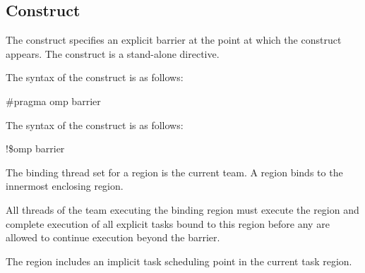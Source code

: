 \subsection{ Construct}
\label{subsec:barrier Construct}
\summary
The  construct specifies an explicit barrier at the point at which the construct 
appears. The  construct is a stand-alone directive.

\syntax
\begin{ccppspecific}
The syntax of the  construct is as follows:

\begin{boxedcode}
\#pragma omp barrier 
\end{boxedcode}
\end{ccppspecific}

\begin{fortranspecific}
The syntax of the  construct is as follows:

\begin{boxedcode}
!\$omp barrier
\end{boxedcode}
\end{fortranspecific}

\binding
The binding thread set for a  region is the current team. A  region 
binds to the innermost enclosing  region. 

\descr
All threads of the team executing the binding  region must execute the 
 region and complete execution of all explicit tasks bound to this  
region before any are allowed to continue execution beyond the barrier.

The  region includes an implicit task scheduling point in the current task 
region.

\def\omptSyncRegionEvents#1{
The \plc{#1-begin} event occurs in each thread encountering the
\code{#1} construct on entry to the \code{#1} region.

The \plc{#1-wait-begin} event occurs when a task begins an interval of active or passive waiting
in a \code{#1} region. 

The \plc{#1-wait-end} event occurs when a task ends an interval of active or passive waiting
and resumes execution in a \code{#1} region. 

The \plc{#1-end} event occurs in each thread encountering the
\code{#1} construct after the #1 synchronization on exit from the
\code{#1} region.
}

